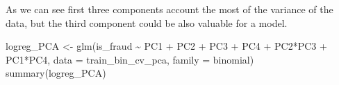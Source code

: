 \documentclass[
]{report}
\newenvironment{Shaded}{\begin{snugshade}}{\end{snugshade}}
\newcommand{\AttributeTok}[1]{\textcolor[rgb]{0.77,0.63,0.00}{#1}}
\newcommand{\DecValTok}[1]{\textcolor[rgb]{0.00,0.00,0.81}{#1}}
\newcommand{\FunctionTok}[1]{\textcolor[rgb]{0.00,0.00,0.00}{#1}}
\newcommand{\NormalTok}[1]{#1}
\newcommand{\OtherTok}[1]{\textcolor[rgb]{0.56,0.35,0.01}{#1}}
\newcommand{\SpecialCharTok}[1]{\textcolor[rgb]{0.00,0.00,0.00}{#1}}
\newcommand{\StringTok}[1]{\textcolor[rgb]{0.31,0.60,0.02}{#1}}
\begin{document}
As we can see first three components account the most of the variance of
the data, but the third component could be also valuable for a model.

\begin{Shaded}
\end{Shaded}

\begin{Shaded}
\end{Shaded}

\begin{Shaded}
\begin{Highlighting}[]
\NormalTok{logreg\_PCA }\OtherTok{\textless{}{-}} \FunctionTok{glm}\NormalTok{(is\_fraud }\SpecialCharTok{\textasciitilde{}} 
\NormalTok{                    PC1 }\SpecialCharTok{+}\NormalTok{ PC2 }\SpecialCharTok{+}\NormalTok{ PC3 }\SpecialCharTok{+}\NormalTok{ PC4 }\SpecialCharTok{+}\NormalTok{ PC2}\SpecialCharTok{*}\NormalTok{PC3 }\SpecialCharTok{+}\NormalTok{ PC1}\SpecialCharTok{*}\NormalTok{PC4,}
                  \AttributeTok{data =}\NormalTok{ train\_bin\_cv\_pca, }\AttributeTok{family =}\NormalTok{ binomial)}
\FunctionTok{summary}\NormalTok{(logreg\_PCA)}
\end{Highlighting}
\end{Shaded}
\end{document}
